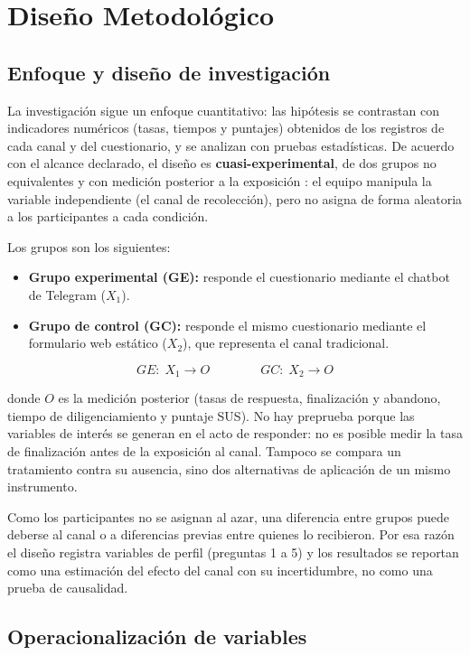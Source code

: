 \documentclass[12pt,letterpaper]{article}
\begin{document}
\section{Diseño Metodológico}

\subsection{Enfoque y diseño de investigación}

La investigación sigue un enfoque cuantitativo: las hipótesis se contrastan con indicadores numéricos (tasas, tiempos y puntajes) obtenidos de los registros de cada canal y del cuestionario, y se analizan con pruebas estadísticas. De acuerdo con el alcance declarado, el diseño es \textbf{cuasi-experimental}, de dos grupos no equivalentes y con medición posterior a la exposición \cite{hernandez2014}: el equipo manipula la variable independiente (el canal de recolección), pero no asigna de forma aleatoria a los participantes a cada condición.

Los grupos son los siguientes:

\begin{itemize}
    \item \textbf{Grupo experimental (GE):} responde el cuestionario mediante el chatbot de Telegram ($X_1$).
    \item \textbf{Grupo de control (GC):} responde el mismo cuestionario mediante el formulario web estático ($X_2$), que representa el canal tradicional.
\end{itemize}

\[
GE:\; X_1 \rightarrow O \qquad\qquad GC:\; X_2 \rightarrow O
\]

donde $O$ es la medición posterior (tasas de respuesta, finalización y abandono, tiempo de diligenciamiento y puntaje SUS). No hay preprueba porque las variables de interés se generan en el acto de responder: no es posible medir la tasa de finalización antes de la exposición al canal. Tampoco se compara un tratamiento contra su ausencia, sino dos alternativas de aplicación de un mismo instrumento.

Como los participantes no se asignan al azar, una diferencia entre grupos puede deberse al canal o a diferencias previas entre quienes lo recibieron. Por esa razón el diseño registra variables de perfil (preguntas 1 a 5) y los resultados se reportan como una estimación del efecto del canal con su incertidumbre, no como una prueba de causalidad.

\subsection{Operacionalización de variables}
\end{document}
